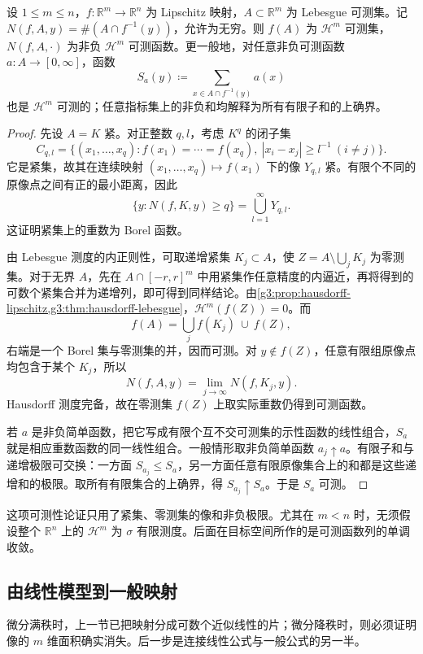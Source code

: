 \begin{proposition}\label{g3:prop:area-multiplicity-measurable}
	设 \(1\le m\le n\)，\(f:\mathbb R^m\to\mathbb R^n\) 为 Lipschitz 映射，\(A\subset\mathbb R^m\) 为 Lebesgue 可测集。记 \(N(f,A,y)=\#(A\cap f^{-1}(y))\)，允许为无穷。则 \(f(A)\) 为 \(\mathcal H^m\) 可测集，\(N(f,A,\cdot)\) 为非负 \(\mathcal H^m\) 可测函数。更一般地，对任意非负可测函数 \(a:A\to[0,\infty]\)，函数
	\[
		S_a(y)\coloneqq\sum_{x\in A\cap f^{-1}(y)}a(x)
	\]
	也是 \(\mathcal H^m\) 可测的；任意指标集上的非负和均解释为所有有限子和的上确界。
\end{proposition}
\begin{proof}
	先设 \(A=K\) 紧。对正整数 \(q,l\)，考虑 \(K^q\) 的闭子集
	\[
		C_{q,l}=\{(x_1,\ldots,x_q):f(x_1)=\cdots=f(x_q),\ |x_i-x_j|\ge l^{-1}\ (i\ne j)\}.
	\]
	它是紧集，故其在连续映射 \((x_1,\ldots,x_q)\mapsto f(x_1)\) 下的像 \(Y_{q,l}\) 紧。有限个不同的原像点之间有正的最小距离，因此
	\[
		\{y:N(f,K,y)\ge q\}=\bigcup_{l=1}^{\infty}Y_{q,l}.
	\]
	这证明紧集上的重数为 Borel 函数。

	由 Lebesgue 测度的内正则性，可取递增紧集 \(K_j\subset A\)，使 \(Z=A\setminus\bigcup_jK_j\) 为零测集。对于无界 \(A\)，先在 \(A\cap[-r,r]^m\) 中用紧集作任意精度的内逼近，再将得到的可数个紧集合并为递增列，即可得到同样结论。由\cref{g3:prop:hausdorff-lipschitz,g3:thm:hausdorff-lebesgue}，\(\mathcal H^m(f(Z))=0\)。而
	\[
		f(A)=\bigcup_jf(K_j)\ \cup\ f(Z),
	\]
	右端是一个 Borel 集与零测集的并，因而可测。对 \(y\notin f(Z)\)，任意有限组原像点均包含于某个 \(K_j\)，所以
	\[
		N(f,A,y)=\lim_{j\to\infty}N(f,K_j,y).
	\]
	Hausdorff 测度完备，故在零测集 \(f(Z)\) 上取实际重数仍得到可测函数。

	若 \(a\) 是非负简单函数，把它写成有限个互不交可测集的示性函数的线性组合，\(S_a\) 就是相应重数函数的同一线性组合。一般情形取非负简单函数 \(a_j\uparrow a\)。有限子和与递增极限可交换：一方面 \(S_{a_j}\le S_a\)，另一方面任意有限原像集合上的和都是这些递增和的极限。取所有有限集合的上确界，得 \(S_{a_j}\uparrow S_a\)。于是 \(S_a\) 可测。
\end{proof}

这项可测性论证只用了紧集、零测集的像和非负极限。尤其在 \(m<n\) 时，无须假设整个 \(\mathbb R^n\) 上的 \(\mathcal H^m\) 为 \(\sigma\) 有限测度。后面在目标空间所作的是可测函数列的单调收敛。

\subsection{由线性模型到一般映射}
\label{g3:subsec:2003:03}
微分满秩时，上一节已把映射分成可数个近似线性的片；微分降秩时，则必须证明像的 \(m\) 维面积确实消失。后一步是连接线性公式与一般公式的另一半。

